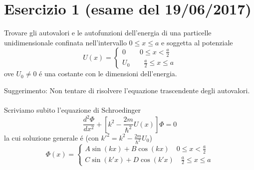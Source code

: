 \documentclass[a4paper]{article}
\begin{document}
    \section*{Esercizio 1 (esame del 19/06/2017)}
        Trovare gli autovalori e le autofunzioni dell'energia di una particelle unidimensionale confinata nell'intervallo $0\leq x\leq a$ e soggetta al potenziale
        \begin{equation*}
            U(x)=
            \begin{cases}
                0\quad\quad 0\leq x <\frac{a}{2}\\
                U_0\quad\quad \frac{a}{2}\leq x \leq a
            \end{cases}
        \end{equation*}
        ove $U_0\neq 0$ \'e una costante con le dimensioni dell'energia.
        \begin{figure}[H]
            \centering
        \end{figure}
        Suggerimento: Non tentare di risolvere l'equazione trascendente degli autovalori.
        \\
        \\
        Scriviamo subito l'equazione di Schroedinger
        \begin{equation*}
            \frac{d^2\Phi}{dx^2}+\left[k^2-\frac{2m}{\hbar^2}U(x)\right]\Phi=0
        \end{equation*}
        la cui soluzione generale \'e (con $k'^2=k^2-\frac{2m}{\hbar^2}U_0$)
        \begin{equation*}
            \Phi(x)=
            \begin{cases}
                A\sin(kx)+B\cos(kx)\quad 0\leq x <\frac{a}{2}\\
                C\sin(k'x)+D\cos(k'x)\quad \frac{a}{2}\leq x \leq a
            \end{cases}
        \end{equation*}
\end{document}

